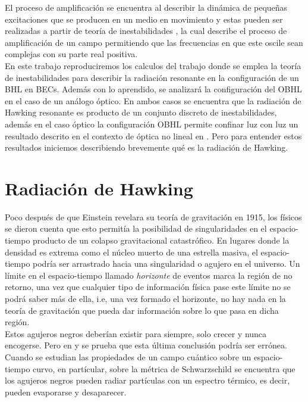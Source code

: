 El proceso de  amplificaci\'{o}n se encuentra al describir la din\'{a}mica de peque\~{n}as excitaciones que se producen en un medio en movimiento y estas pueden ser realizadas a partir de teor\'{i}a de inestabilidades \citep{Hydrodynamic}, la cual describe el proceso de amplificaci\'{o}n  de un campo permitiendo que las frecuencias en que este oscile sean complejas con su parte real positiva.\\

En este trabajo reproduciremos los calculos del trabajo \citep{2018Bermudez} donde se emplea la teor\'{i}a de inestabilidades para describir la radiaci\'{o}n resonante en la configuraci\'{o}n de un BHL en BECs. Adem\'{a}s con lo aprendido, se analizar\'{a} la configuraci\'{o}n del OBHL en el caso de un an\'{a}logo \'{o}ptico. En ambos casos se encuentra que la radiaci\'{o}n de Hawking  resonante es producto de un conjunto discreto de  inestabilidades, adem\'{a}s en el caso \'{o}ptico la configuraci\'{o}n OBHL permite confinar luz con luz un resultado descrito en el contexto de \'{o}ptica no lineal en \cite{Plansinis2016}. Pero para entender estos resultados iniciemos describiendo brevemente qu\'{e}  es la radiaci\'{o}n de Hawking.

\section{Radiaci\'{o}n de Hawking}

Poco después de que Einstein revelara su teoría  de gravitaci\'{o}n en 1915, los físicos se dieron cuenta que esto permitía la posibilidad de singularidades en el espacio-tiempo producto de un colapso gravitacional catastrófico. En lugares donde la densidad es extrema como el núcleo muerto de una estrella masiva, el espacio-tiempo podría ser arrastrado hacia una singularidad o agujero en el universo. Un límite en el espacio-tiempo llamado \textit{horizonte} de eventos marca la regi\'{o}n de no retorno, una vez que cualquier tipo de informaci\'{o}n f\'{i}sica pase este l\'{i}mite no se podr\'{a} saber m\'{a}s de ella, i.e, una vez formado el horizonte, no hay nada en la teoría de gravitaci\'{o}n que pueda dar informaci\'{o}n sobre lo que pasa en dicha regi\'{o}n. \\

Estos agujeros negros deberían existir para siempre, solo crecer y nunca encogerse. Pero en \cite{Hawking1974} y \cite{Hawking1975} se prueba que esta \'{u}ltima conclusi\'{o}n podr\'{i}a ser err\'{o}nea. Cuando se estudian las propiedades de un campo cu\'{a}ntico sobre un espacio-tiempo curvo, en part\'{i}cular, sobre la m\'{e}trica de Schwarzschild se encuentra que los agujeros negros pueden radiar part\'{i}culas con un espectro t\'{e}rmico, es decir, pueden evaporarse y desaparecer.\\

